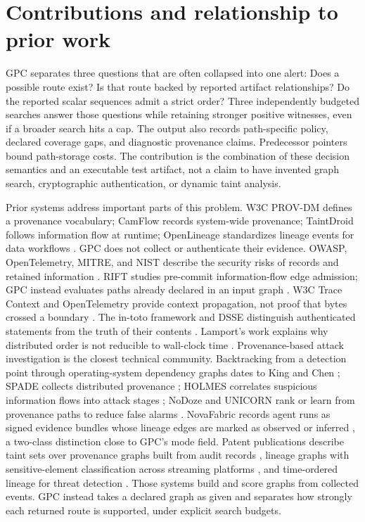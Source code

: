 \documentclass[11pt,letterpaper]{article}
\begin{document}
\section{Contributions and relationship to prior work}
GPC separates three questions that are often collapsed into one alert: Does a possible route exist? Is that route backed by reported artifact relationships? Do the reported scalar sequences admit a strict order? Three independently budgeted searches answer those questions while retaining stronger positive witnesses, even if a broader search hits a cap. The output also records path-specific policy, declared coverage gaps, and diagnostic provenance claims. Predecessor pointers bound path-storage costs. The contribution is the combination of these decision semantics and an executable test artifact, not a claim to have invented graph search, cryptographic authentication, or dynamic taint analysis.

Prior systems address important parts of this problem. W3C PROV-DM defines a provenance vocabulary; CamFlow records system-wide provenance; TaintDroid follows information flow at runtime; OpenLineage standardizes lineage events for data workflows \cite{prov,camflow,taintdroid,openlineage}. GPC does not collect or authenticate their evidence. OWASP, OpenTelemetry, MITRE, and NIST describe the security risks of records and retained information \cite{owasp_logging,otel_sensitive,nist_logging}. RIFT studies pre-commit information-flow edge admission; GPC instead evaluates paths already declared in an input graph \cite{rift}. W3C Trace Context and OpenTelemetry provide context propagation, not proof that bytes crossed a boundary \cite{w3ctrace,otelapi}. The in-toto framework and DSSE distinguish authenticated statements from the truth of their contents \cite{intoto,dsse}. Lamport's work explains why distributed order is not reducible to wall-clock time \cite{lamport}. Provenance-based attack investigation is the closest technical community. Backtracking from a detection point through operating-system dependency graphs dates to King and Chen \cite{kingchen}; SPADE collects distributed provenance \cite{spade}; HOLMES correlates suspicious information flows into attack stages \cite{holmes}; NoDoze and UNICORN rank or learn from provenance paths to reduce false alarms \cite{nodoze,unicorn}. NovaFabric records agent runs as signed evidence bundles whose lineage edges are marked as observed or inferred \cite{novafabric}, a two-class distinction close to GPC's mode field. Patent publications describe taint sets over provenance graphs built from audit records \cite{pat_sri}, lineage graphs with sensitive-element classification across streaming platforms \cite{pat_jpm}, and time-ordered lineage for threat detection \cite{pat_tannin}. Those systems build and score graphs from collected events. GPC instead takes a declared graph as given and separates how strongly each returned route is supported, under explicit search budgets.
\end{document}
